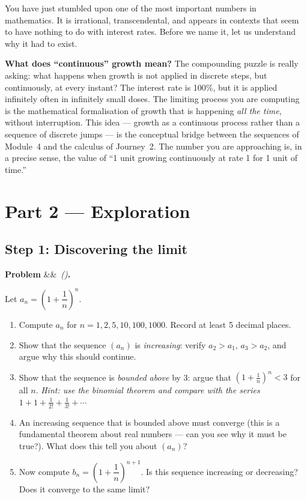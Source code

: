 \documentclass[12pt, a4paper]{article}
\newcounter{problem}
\newenvironment{problem}[1][]{%
  \refstepcounter{problem}%
  \par\vspace{6pt}%
  \noindent\textbf{\color{MidBlue}Problem \theproblem}%
  \ifx&#1&\else\ \textit{(#1)}\fi\textbf{.}\enskip
}{\par\vspace{4pt}}
\begin{document}
\medskip
You have just stumbled upon one of the most important numbers in mathematics. It is irrational, transcendental, and appears in contexts that seem to have nothing to do with interest rates. Before we name it, let us understand why it had to exist.

\begin{thought}
\textbf{What does ``continuous'' growth mean?}
The compounding puzzle is really asking: what happens when growth is not applied in discrete steps, but continuously, at every instant? The interest rate is 100\%, but it is applied infinitely often in infinitely small doses. The limiting process you are computing is the mathematical formalisation of growth that is happening \emph{all the time}, without interruption. This idea --- growth as a continuous process rather than a sequence of discrete jumps --- is the conceptual bridge between the sequences of Module~4 and the calculus of Journey~2. The number you are approaching is, in a precise sense, the value of ``1 unit growing continuously at rate 1 for 1 unit of time.''
\end{thought}

\section{Part 2 \texorpdfstring{---}{--} Exploration}

\subsection{Step 1: Discovering the limit}

\begin{problem}
\label{prob:e_limit}
Let $a_n = \left(1 + \dfrac{1}{n}\right)^n$.

\begin{enumerate}[label=(\alph*), topsep=2pt]
  \item Compute $a_n$ for $n = 1, 2, 5, 10, 100, 1000$. Record at least 5 decimal places.
  \item Show that the sequence $(a_n)$ is \emph{increasing}: verify $a_2 > a_1$, $a_3 > a_2$, and argue why this should continue.
  \item Show that the sequence is \emph{bounded above} by 3: argue that $\left(1+\tfrac{1}{n}\right)^n < 3$ for all $n$. \textit{Hint: use the binomial theorem and compare with the series $1 + 1 + \tfrac{1}{2!} + \tfrac{1}{3!} + \cdots$}
  \item An increasing sequence that is bounded above must converge (this is a fundamental theorem about real numbers --- can you see why it must be true?). What does this tell you about $(a_n)$?
  \item Now compute $b_n = \left(1 + \dfrac{1}{n}\right)^{n+1}$. Is this sequence increasing or decreasing? Does it converge to the same limit?
\end{enumerate}
\end{problem}
\end{document}
